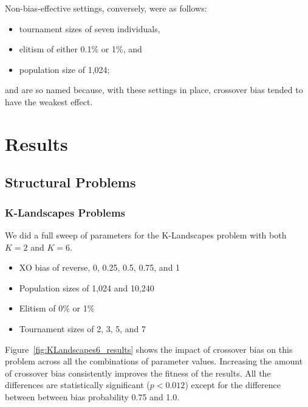 \documentclass{sig-alternate}
\begin{document}
Non-bias-effective settings, conversely, were as follows:
\begin{itemize}
\item tournament sizes of seven individuals,
\item elitism of either 0.1\% or 1\%, and
\item population size of 1,024;
\end{itemize}
and are so named because, with these settings in place, crossover bias tended to have the weakest effect.

\section{Results} \label{sec:Results}

\subsection{Structural Problems}

\subsubsection{K-Landscapes Problems}

We did a full sweep of parameters for the K-Landscapes problem with both $K=2$ and $K=6$.

\begin{itemize}
	\item XO bias of reverse, 0, 0.25, 0.5, 0.75, and 1
	\item Population sizes of 1,024 and 10,240
	\item Elitism of 0\% or 1\%
	\item Tournament sizes of 2, 3, 5, and 7
\end{itemize}

Figure~\ref{fig:KLandscapes6_results} shows the impact of crossover bias on this problem across all the 
combinations of parameter values. Increasing the amount of crossover bias consistently improves the 
fitness of the results. All the differences are statistically significant ($p < 0.012$) except for the difference between
between bias probability 0.75 and 1.0.

%
%
%
%
\end{document}
